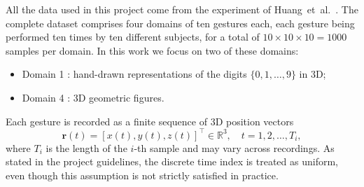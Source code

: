 
All the data used in this project come from the experiment of
Huang~et~al.~\cite{Huang2019}. The complete dataset comprises four domains of
ten gestures each, each gesture being performed ten times by ten different
subjects, for a total of $10 \times 10 \times 10 = 1000$ samples per domain. In
this work we focus on two of these domains:
\begin{itemize}\itemsep 0em
    \item Domain 1 :  hand-drawn representations of the digits
    $\{0, 1, \dots, 9\}$ in 3D;
    \item Domain 4 : 3D geometric figures.
\end{itemize}

Each gesture is recorded as a finite sequence of 3D position vectors
\begin{equation}
    \mathbf{r}(t) = [x(t), y(t), z(t)]^{\top} \in \mathbb{R}^{3},
    \quad t = 1, 2, \dots, T_i ,
\end{equation}
where $T_i$ is the length of the $i$-th sample and may vary across recordings.
As stated in the project guidelines, the discrete time index is treated as
uniform, even though this assumption is not strictly satisfied in practice.